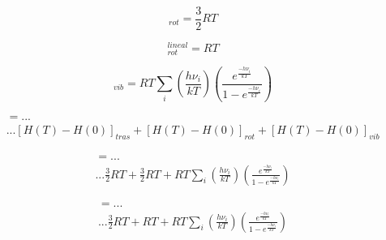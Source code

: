 \documentclass{beamer}
\begin{document}
\begin{frame}[fragile]
\begin{equation}
[H(T)-H(0)]_{rot} = \mathrm{\frac{3}{2}} RT
\label{eq:3.29}
\end{equation}


\begin{equation}
[H(T)-H(0)]_{rot}^{lineal} =  RT
\label{eq:3.30}
\end{equation}

\begin{equation}
[H(T)-H(0)]_{vib}=RT \sum_i \left(\frac{h\nu_i}{kT}\right)\left(\frac{e^{\frac{-h\nu_i}{kT}}}{1-e^{\frac{-h\nu_i}{kT}}}\right)
\label{eq:3.31}
\end{equation}
\end{frame}

\begin{frame}[fragile]


\begin{multline}
[H(298.15)-H(0)] =... \\... [H(T)-H(0)]_{tras}+[H(T)-H(0)]_{rot}+[H(T)-H(0)]_{vib}
\end{multline}


\begin{multline}
[H(298.15)-H(0)] =... \\... \mathrm{\frac{3}{2}} RT+ \mathrm{\frac{3}{2}} RT + RT \sum_i \left(\frac{h\nu_i}{kT}\right)\left(\frac{e^{\frac{-h\nu_i}{kT}}}{1-e^{\frac{-h\nu_i}{kT}}}\right)
\end{multline}

\begin{multline}
[H(298.15)-H(0)] =... \\... \mathrm{\frac{3}{2}} RT+  RT + RT \sum_i \left(\frac{h\nu_i}{kT}\right)\left(\frac{e^{\frac{-h\nu_i}{kT}}}{1-e^{\frac{-h\nu_i}{kT}}}\right)
\end{multline}

\end{frame}
\end{document}
